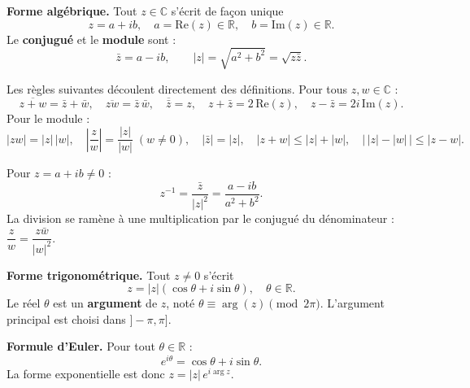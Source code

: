 


\begin{tcolorbox}[thmbox]
  \textbf{Forme algébrique.}\enspace%
  Tout $z \in \mathbb{C}$ s'écrit de façon unique
  \[
    z = a + ib, \quad a = \mathrm{Re}(z) \in \mathbb{R},\quad b = \mathrm{Im}(z) \in \mathbb{R}.
  \]
  Le \textbf{conjugué} et le
  \textbf{module} sont :
  \[
    \bar{z} = a - ib, \qquad |z| = \sqrt{a^2 + b^2} = \sqrt{z\bar{z}}.
  \]
\end{tcolorbox}


Les règles suivantes découlent directement des définitions. Pour tous
$z, w \in \mathbb{C}$ :
\[
  \overline{z + w} = \bar{z} + \bar{w}, \quad
  \overline{zw} = \bar{z}\,\bar{w}, \quad
  \overline{\bar{z}} = z, \quad
  z + \bar{z} = 2\,\mathrm{Re}(z), \quad
  z - \bar{z} = 2i\,\mathrm{Im}(z).
\]
Pour le module :
\[
  |zw| = |z|\,|w|, \quad
  \left|\frac{z}{w}\right| = \frac{|z|}{|w|} \;(w \neq 0), \quad
  |\bar{z}| = |z|, \quad
  |z + w| \leq |z| + |w|, \quad
  \bigl|\,|z| - |w|\,\bigr| \leq |z - w|.
\]

Pour $z = a + ib \neq 0$ :
\[
  z^{-1} = \frac{\bar{z}}{|z|^2} = \frac{a - ib}{a^2 + b^2}.
\]
La division se ramène à une multiplication par le conjugué du dénominateur :
$\dfrac{z}{w} = \dfrac{z\bar{w}}{|w|^2}$.

\decsep{}


\begin{tcolorbox}[thmbox]
  \textbf{Forme trigonométrique.}\enspace%
  Tout $z \neq 0$ s'écrit
  \[
    z = |z|(\cos\theta + i\sin\theta), \quad \theta \in \mathbb{R}.
  \]
  Le réel $\theta$ est un \textbf{argument} de $z$, noté
  $\theta \equiv \arg(z) \pmod{2\pi}$. L'argument principal est choisi dans
  $]-\pi, \pi]$.

  \medskip
  \textbf{Formule d'Euler.}\enspace%
  Pour tout $\theta \in \mathbb{R}$ :
  \[
    e^{i\theta} = \cos\theta + i\sin\theta.
  \]
  La forme exponentielle est donc $z = |z|\,e^{i\arg z}$.
\end{tcolorbox}

